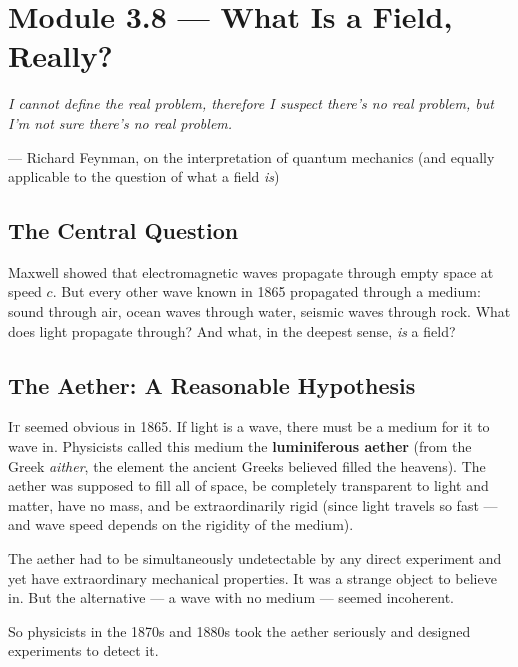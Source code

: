 \documentclass[12pt, a4paper, twoside]{book}
\newcounter{problem}[chapter]
\theoremstyle{disc}
\begin{document}
\section{Module 3.8 — What Is a Field, Really?}
\label{sec:what_is_field}

\epigraph{\itshape
  I cannot define the real problem, therefore I suspect there's no real problem,
  but I'm not sure there's no real problem.
}{--- Richard Feynman, on the interpretation of quantum mechanics
  (and equally applicable to the question of what a field \emph{is})}

\subsection{The Central Question}

\begin{puzzlebox}
Maxwell showed that electromagnetic waves propagate through empty space at speed $c$. But every other wave known in 1865 propagated through a medium: sound through air, ocean waves through water, seismic waves through rock. What does light propagate through? And what, in the deepest sense, \emph{is} a field?
\end{puzzlebox}

\subsection{The Aether: A Reasonable Hypothesis}

\lettrine[lines=3,loversize=0.08]{\textcolor{accent}{I}}{t} seemed obvious in 1865. If light is a wave, there must be a medium for it to wave in. Physicists called this medium the \textbf{luminiferous aether} (from the Greek \textit{aither}, the element the ancient Greeks believed filled the heavens). The aether was supposed to fill all of space, be completely transparent to light and matter, have no mass, and be extraordinarily rigid (since light travels so fast --- and wave speed depends on the rigidity of the medium).

The aether had to be simultaneously undetectable by any direct experiment and yet have extraordinary mechanical properties. It was a strange object to believe in. But the alternative --- a wave with no medium --- seemed incoherent.

So physicists in the 1870s and 1880s took the aether seriously and designed experiments to detect it.
\end{document}
